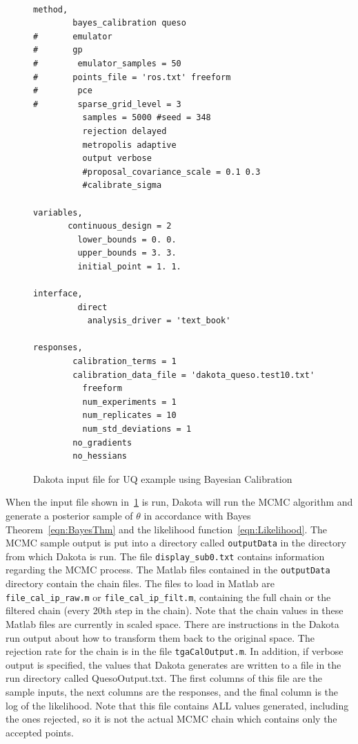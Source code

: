 \begin{figure}[htbp!]
\centering
\begin{bigbox}
\begin{small}
\begin{verbatim}

method,
        bayes_calibration queso
#       emulator
#       gp
#        emulator_samples = 50
#       points_file = 'ros.txt' freeform
#        pce 
#        sparse_grid_level = 3 
          samples = 5000 #seed = 348                                    
          rejection delayed
          metropolis adaptive
          output verbose
          #proposal_covariance_scale = 0.1 0.3
          #calibrate_sigma
 
variables,
       continuous_design = 2
         lower_bounds = 0. 0.
         upper_bounds = 3. 3.
         initial_point = 1. 1.

interface,
         direct 
           analysis_driver = 'text_book'

responses,
        calibration_terms = 1
        calibration_data_file = 'dakota_queso.test10.txt'
          freeform
          num_experiments = 1
          num_replicates = 10 
          num_std_deviations = 1
        no_gradients
        no_hessians
\end{verbatim}
\end{small}
\end{bigbox}
\caption{Dakota input file for UQ example using Bayesian Calibration}
\label{uq:figure18}
\end{figure}

When the input file shown in~\ref{uq:figure18} is run, 
Dakota will run the MCMC algorithm and generate a posterior sample of 
$\theta$ in accordance with Bayes Theorem~\ref{eqn:BayesThm} and 
the likelihood function~\ref{eqn:Likelihood}. The MCMC sample output 
is put into a directory called \texttt{outputData} in the directory 
from which Dakota is run.  The file \texttt{display\_sub0.txt} 
contains information regarding the MCMC process.  The 
Matlab files contained in the \texttt{outputData} directory
contain the chain files.  The files to load in Matlab are 
\texttt{file\_cal\_ip\_raw.m} or \texttt{file\_cal\_ip\_filt.m}, containing 
the full chain or the filtered chain (every 20th step 
in the chain).  Note that the chain values in these Matlab files 
are currently in scaled space.  There are instructions in the Dakota 
run output about how to transform them back to the original space. 
The rejection rate for the chain is in the file \texttt{tgaCalOutput.m}.
In addition, if verbose output is specified, 
the values that Dakota generates are 
written to a file in the run directory called QuesoOutput.txt. 
The first columns of this file are the sample inputs, the next columns 
are the responses, and the final column is the log of the 
likelihood.  Note that this file contains ALL values generated, 
including the ones rejected, so it is not the actual MCMC
chain which contains only the accepted points.

